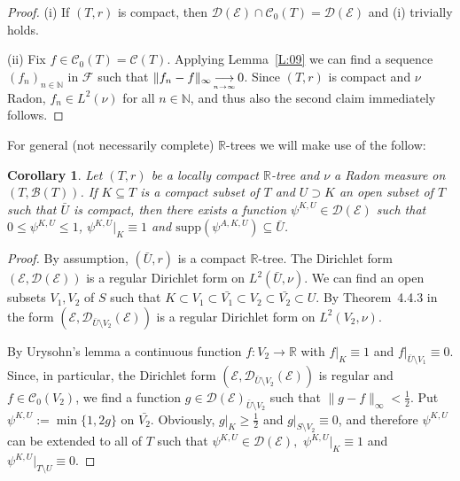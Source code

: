 \documentclass[11pt]{amsart}
\numberwithin{equation}{section}
\newtheorem{cor}[definition]{Corollary}
\begin{document}
{\begin{proof} (i) If $(T,r)$ is compact, then ${\mathcal D}({\mathcal E})\cap{\mathcal C}_0(T)={\mathcal D}({\mathcal E})$ and (i) trivially holds. {\smallskip}

(ii) Fix $f\in{\mathcal C}_0(T)={\mathcal C}(T)$. Applying Lemma~\ref{L:09} we can find a sequence $(f_n)_{n\in\mathbb{N}}$ in ${\mathcal F}$ such that $\|f_n-f\|_\infty{{_{\displaystyle\longrightarrow\atop n\to\infty}}} 0$. Since $(T,r)$ is compact and $\nu$ Radon, $f_n\in L^2(\nu)$ for all $n\in\mathbb{N}$, and thus also the second claim immediately follows.
\end{proof}{\smallskip}

For general (not necessarily complete) ${{\mathbb R}}$-trees we will make use of the follow:

\begin{cor} Let $(T,r)$ be a locally compact ${{\mathbb R}}$-tree and $\nu$ a Radon measure on $(T,{\mathcal B}(T))$.  If $K\subseteq T$ is a compact subset of $T$ and $U\supset K$ an open subset of $T$ such that $\bar{U}$ is compact, then
there exists a function $\psi^{K,U}\in {{\mathcal D}}({\mathcal E})$ such that $0\le \psi^{K,U}\le 1$, $\psi^{K,U}|_K\equiv 1$ and $\mathrm{supp}(\psi^{A,K,U})\subseteq\bar{U}$.
\label{Cor:06}
\end{cor}{\smallskip}

\begin{proof} By assumption,    $(\bar{U},r)$ is a compact ${{\mathbb R}}$-tree.  The Dirichlet form $({\mathcal E},{\mathcal D}({\mathcal E}))$ is a regular Dirichlet form on $L^{2}(\bar{U},\nu)$.   We can find an open subsets $V_{1} , V_{2}$ of $S$ such that $K\subset V_{1}\subset\bar{V_{1}}\subset V_{2}\subset\bar{V_{2}}\subset U.$  By Theorem~4.4.3 in \cite{FukushimaOshimaTakeda1994} the form  $({\mathcal E},{\mathcal D}_{\bar{U}\setminus{V_{2}}}({\mathcal E}))$ is a regular Dirichlet form on $L^{2}(V_{2},\nu)$.

By Urysohn's lemma a continuous function $f: V_{2}\rightarrow {{\mathbb R}}$ with $f\big|_K\equiv 1$ and $f\big|_{\bar{U}\setminus V_{1}}\equiv 0$. Since, in particular, the Dirichlet form $({\mathcal E},{\mathcal D}_{\bar{U}\setminus{V_{2}}}({\mathcal E}))$ is regular and $f\in{\mathcal C}_0(V_{2})$, we find a function $g\in{\mathcal D}({\mathcal E})_{\bar{U}\setminus{V_{2}}}$ such that $\|g-f\|_\infty<\tfrac{1}{2}$. Put $\psi^{K,U}:=\min\{1,2g\}$ on ${\bar{V_{2}}}$. Obviously, $g\big|_K\ge \tfrac{1}{2}$ and $g\big|_{S\setminus V_{2}}\equiv 0$, and therefore $\psi^{K,U}$ can be extended to all of $T$ such that $\psi^{K,U} \in {{\mathcal D}}({\mathcal E}),$ $\psi^{K,U}\big|_K\equiv 1$ and $\psi^{K,U}\big|_{T\setminus U}\equiv 0$.
\end{proof}{\smallskip}

}
\end{document}
